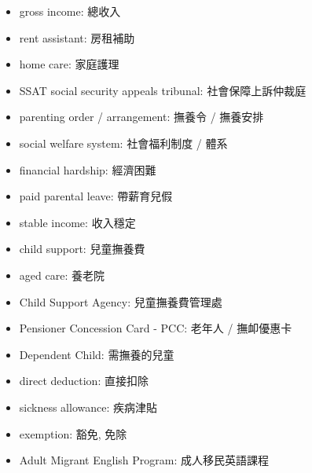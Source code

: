 \begin{multicols}{2}
\begin{itemize}
  \item gross income: 總收入
  \item rent assistant: 房租補助
  \item home care: 家庭護理
  \item SSAT social security appeals tribunal: 社會保障上訴仲裁庭
  \item parenting order / arrangement: 撫養令 / 撫養安排
  \item social welfare system: 社會福利制度 / 體系
  \item financial hardship: 經濟困難
  \item paid parental leave: 帶薪育兒假
  \item stable income: 收入穩定
  \item child support: 兒童撫養費
  \item aged care: 養老院
  \item Child Support Agency: 兒童撫養費管理處
  \item Pensioner Concession Card - PCC: 老年人 / 撫卹優惠卡
  \item Dependent Child: 需撫養的兒童
  \item direct deduction: 直接扣除
  \item sickness allowance: 疾病津貼
  \item exemption: 豁免, 免除
  \item Adult Migrant English Program: 成人移民英語課程
\end{itemize}
\end{multicols}